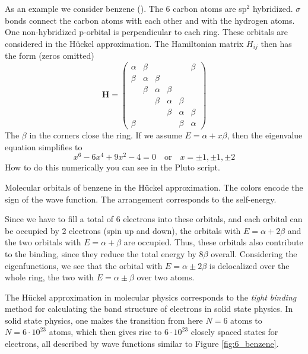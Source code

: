 As an example we consider benzene (). The 6 carbon atoms are sp$^2$ hybridized. $\sigma$ bonds connect the carbon atoms with each other and with the hydrogen atoms. One non-hybridized p-orbital is perpendicular to each ring. These orbitals are considered in the Hückel approximation. The Hamiltonian matrix $H_{ij}$ then has the form (zeros omitted)
\begin{equation}
\mathbf{H} = 
 \begin{pmatrix}
  \alpha & \beta & & &  & \beta \\
  \beta & \alpha & \beta & & \\
  & \beta & \alpha & \beta & & \\
 & & \beta & \alpha & \beta & \\
& & & \beta & \alpha & \beta \\
\beta &  & & & \beta & \alpha 
 \end{pmatrix} 
\end{equation}
The $\beta$ in the corners close the ring.
If we assume $E = \alpha + x \beta$, then the eigenvalue equation simplifies to 
\begin{equation}
x^6 - 6 x^4 + 9x^2 - 4 = 0 \quad \text{or} \quad x = \pm 1, \pm 1, \pm 2
\end{equation}
How to do this numerically you can see in the  
Pluto script.




\begin{marginfigure}[20mm]
\caption{Molecular orbitals of benzene in the Hückel approximation. The colors encode the sign of the wave function. The arrangement corresponds to the self-energy.\label{fig:6_benzene}}
\end{marginfigure}

Since we have to fill a total of 6 electrons into these orbitals, and each orbital can be occupied by 2 electrons (spin up and down), the orbitals with $E=\alpha + 2 \beta$ and the two orbitals with $E = \alpha + \beta$ are occupied. Thus, these orbitals also contribute to the binding, since they reduce the total energy by $8\beta$ overall. Considering the eigenfunctions, we see that the orbital with $E=\alpha \pm 2 \beta$ is delocalized over the whole ring, the two with $E = \alpha \pm \beta$ over two atoms.

The Hückel approximation in molecular physics corresponds to the \emph{tight binding} method for calculating the band structure of electrons in solid state physics. In solid state physics, one makes the transition from here $N=6$ atoms to $N= 6 \cdot 10^{23}$ atoms, which then gives rise to $6 \cdot 10^{23}$ closely spaced states for electrons, all described by wave functions similar to Figure \ref{fig:6_benzene}.

